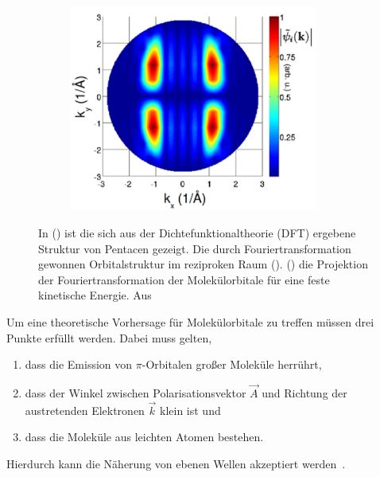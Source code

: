 \begin{figure}
\begin{subfigure}{0.3\textwidth}
                \caption{}
                \label{fig:DFT2}
            \end{subfigure}
            \begin{subfigure}{0.3\textwidth}
                \centering
                \includegraphics[width=0.9\textwidth]{DFT3.PNG}
                \caption{}
                \label{fig:DFT3}
            \end{subfigure}
            \caption{In () ist die sich aus der Dichtefunktionaltheorie (DFT) ergebene Struktur von Pentacen gezeigt.
            Die durch Fouriertransformation gewonnen Orbitalstruktur im reziproken Raum ().
            () die Projektion der Fouriertransformation der Molekülorbitale für eine feste kinetische Energie.
            Aus~\cite{MM_2}}
            \label{fig:DFT}
        \end{figure}
        Um eine theoretische Vorhersage für Molekülorbitale zu treffen müssen drei Punkte erfüllt werden.
        Dabei muss gelten, 
        \begin{enumerate}
            \item dass die Emission von $\pi$-Orbitalen großer Moleküle herrührt,
            \item dass der Winkel zwischen Polarisationsvektor $\vec{A}$ und Richtung der austretenden Elektronen $\vec{k}$ klein ist und
            \item dass die Moleküle aus leichten Atomen bestehen.
        \end{enumerate}
        Hierdurch kann die Näherung von ebenen Wellen akzeptiert werden~\cite{MM_2}.
